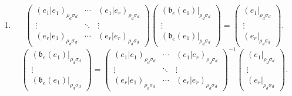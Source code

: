 \documentclass[aps,preprint]{revtex4}
\begin{document}
\begin{enumerate}
\begin{enumerate}
\begin{enumerate}
\item 
\begin{equation}
\left( 
\begin{array}{ccc}
\left( \left. e_{1}\right\vert e_{1}\right) _{\rho _{d}\sigma _{d}} & \cdots
& \left( \left. e_{1}\right\vert e_{r}\right) _{\rho _{d}\sigma _{d}} \\ 
\vdots & \ddots & \vdots \\ 
\left( \left. e_{r}\right\vert e_{1}\right) _{\rho _{d}\sigma _{d}} & \cdots
& \left( \left. e_{r}\right\vert e_{r}\right) _{\rho _{d}\sigma _{d}}%
\end{array}%
\right) \left( 
\begin{array}{c}
\left( \mathfrak{b}_{e}\left( e_{1}\right) \right\vert _{\rho _{d}\sigma
_{d}} \\ 
\vdots \\ 
\left( \mathfrak{b}_{e}\left( e_{1}\right) \right\vert _{\rho _{d}\sigma
_{d}}%
\end{array}%
\right) =\left( 
\begin{array}{c}
\left( e_{1}\right\vert _{\rho _{d}\sigma _{d}} \\ 
\vdots \\ 
\left( e_{r}\right\vert _{\rho _{d}\sigma _{d}}%
\end{array}%
\right) .
\end{equation}%
\begin{equation}
\left( 
\begin{array}{c}
\left( \mathfrak{b}_{e}\left( e_{1}\right) \right\vert _{\rho _{d}\sigma
_{d}} \\ 
\vdots \\ 
\left( \mathfrak{b}_{e}\left( e_{1}\right) \right\vert _{\rho _{d}\sigma
_{d}}%
\end{array}%
\right) =\left( 
\begin{array}{ccc}
\left( \left. e_{1}\right\vert e_{1}\right) _{\rho _{d}\sigma _{d}} & \cdots
& \left( \left. e_{1}\right\vert e_{r}\right) _{\rho _{d}\sigma _{d}} \\ 
\vdots & \ddots & \vdots \\ 
\left( \left. e_{r}\right\vert e_{1}\right) _{\rho _{d}\sigma _{d}} & \cdots
& \left( \left. e_{r}\right\vert e_{r}\right) _{\rho _{d}\sigma _{d}}%
\end{array}%
\right) ^{-1}\left( 
\begin{array}{c}
\left( e_{1}\right\vert _{\rho _{d}\sigma _{d}} \\ 
\vdots \\ 
\left( e_{r}\right\vert _{\rho _{d}\sigma _{d}}%
\end{array}%
\right) .
\end{equation}
\end{enumerate}
\end{enumerate}


\end{enumerate}
\end{document}
